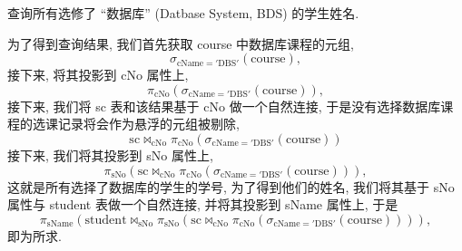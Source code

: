 \documentclass[10pt,UTF8]{book} %
\begin{document}
\begin{example}
    查询所有选修了 “数据库” (Datbase System, BDS) 的学生姓名.
    \begin{sol}
        为了得到查询结果, 我们首先获取 course 中数据库课程的元组,
        \[ \sigma_\mathrm{cName='DBS'} (\mathrm{course}), \]
        接下来, 将其投影到 cNo 属性上,
        \[ \pi_\mathrm{cNo} \left(
            \sigma_\mathrm{cName='DBS'} (\mathrm{course})
        \right), \]
        接下来, 我们将 sc 表和该结果基于 cNo 做一个自然连接,
        于是没有选择数据库课程的选课记录将会作为悬浮的元组被剔除,
        \[ \mathrm{sc} \Join_\mathrm{cNo} \pi_\mathrm{cNo} \left(
            \sigma_\mathrm{cName='DBS'} (\mathrm{course})
        \right) \]
        接下来, 我们将其投影到 sNo 属性上,
        \[ \pi_\mathrm{sNo} \left(
            \mathrm{sc} \Join_\mathrm{cNo} \pi_\mathrm{cNo} \left(
            \sigma_\mathrm{cName='DBS'} (\mathrm{course})
        \right)
        \right), \]
        这就是所有选择了数据库的学生的学号,
        为了得到他们的姓名, 我们将其基于 sNo 属性与 student 表做一个自然连接,
        并将其投影到 sName 属性上, 于是
        \[ \pi_\mathrm{sName} \left(
            \mathrm{student} \Join_\mathrm{sNo}
            \pi_\mathrm{sNo} \left(
                \mathrm{sc} \Join_\mathrm{cNo} \pi_\mathrm{cNo} \left(
                    \sigma_\mathrm{cName='DBS'} (\mathrm{course})
                \right)
            \right)
        \right), \]
        即为所求.
    \end{sol}
\end{example}
\end{document}

